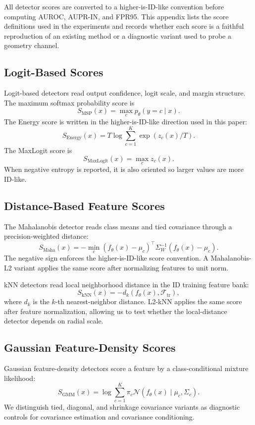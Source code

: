 All detector scores are converted to a higher-is-ID-like convention before
computing AUROC, AUPR-IN, and FPR95. This appendix lists the score definitions
used in the experiments and records whether each score is a faithful
reproduction of an existing method or a diagnostic variant used to probe a
geometry channel.

\subsection{Logit-Based Scores}
\label{app:logit-based-scores}

Logit-based detectors read output confidence, logit scale, and margin structure.
The maximum softmax probability score is
\[
    S_{\mathrm{MSP}}(x)
    =
    \max_c p_\theta(y=c\mid x).
\]
The Energy score is written in the higher-is-ID-like direction used in this
paper:
\[
    S_{\mathrm{Energy}}(x)
    =
    T\log\sum_{c=1}^{K}\exp(z_c(x)/T).
\]
The MaxLogit score is
\[
    S_{\mathrm{MaxLogit}}(x)
    =
    \max_c z_c(x).
\]
When negative entropy is reported, it is also oriented so larger values are more
ID-like.

\subsection{Distance-Based Feature Scores}
\label{app:distance-based-feature-scores}

The Mahalanobis detector reads class means and tied covariance through a
precision-weighted distance:
\[
    S_{\mathrm{Maha}}(x)
    =
    -\min_c
    (f_\theta(x)-\mu_c)^\top
    \Sigma_W^{-1}
    (f_\theta(x)-\mu_c).
\]
The negative sign enforces the higher-is-ID-like score convention. A
Mahalanobis-L2 variant applies the same score after normalizing features to unit
norm.

kNN detectors read local neighborhood distance in the ID training feature bank:
\[
    S_{\mathrm{kNN}}(x)
    =
    -d_k(f_\theta(x),\mathcal{F}_{\mathrm{tr}}),
\]
where \(d_k\) is the \(k\)-th nearest-neighbor distance. L2-kNN applies the same
score after feature normalization, allowing us to test whether the
local-distance detector depends on radial scale.

\subsection{Gaussian Feature-Density Scores}
\label{app:gaussian-feature-density-scores}

Gaussian feature-density detectors score a feature by a
class-conditional mixture likelihood:
\[
    S_{\mathrm{GMM}}(x)
    =
    \log \sum_{c=1}^{K}
    \pi_c
    \mathcal{N}(f_\theta(x)\mid \mu_c,\Sigma_c).
\]
We distinguish tied, diagonal, and shrinkage covariance variants as diagnostic
controls for covariance estimation and covariance conditioning.

